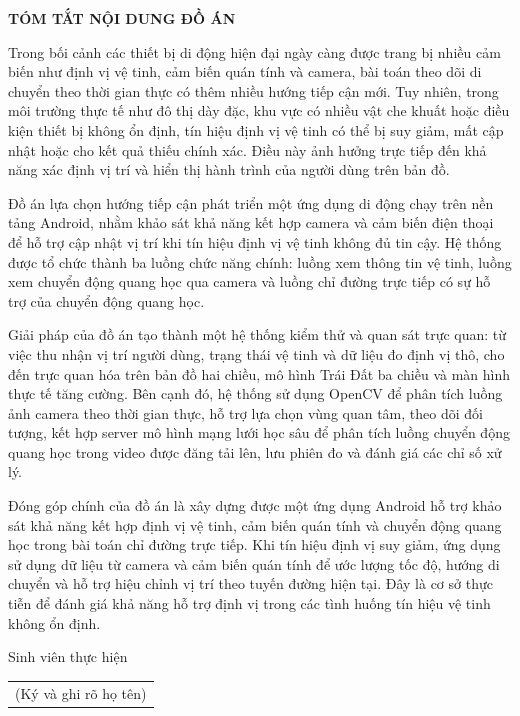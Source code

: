 \documentclass[../DoAn.tex]{subfiles}
\begin{document}
\begin{center}
    \Large{\textbf{TÓM TẮT NỘI DUNG ĐỒ ÁN}}\\
\end{center}
\vspace{1cm}

Trong bối cảnh các thiết bị di động hiện đại ngày càng được trang bị nhiều cảm biến như định vị vệ tinh, cảm biến quán tính và camera, bài toán theo dõi di chuyển theo thời gian thực có thêm nhiều hướng tiếp cận mới. Tuy nhiên, trong môi trường thực tế như đô thị dày đặc, khu vực có nhiều vật che khuất hoặc điều kiện thiết bị không ổn định, tín hiệu định vị vệ tinh có thể bị suy giảm, mất cập nhật hoặc cho kết quả thiếu chính xác. Điều này ảnh hưởng trực tiếp đến khả năng xác định vị trí và hiển thị hành trình của người dùng trên bản đồ.

Đồ án lựa chọn hướng tiếp cận phát triển một ứng dụng di động chạy trên nền tảng Android, nhằm khảo sát khả năng kết hợp camera và cảm biến điện thoại để hỗ trợ cập nhật vị trí khi tín hiệu định vị vệ tinh không đủ tin cậy. Hệ thống được tổ chức thành ba luồng chức năng chính: luồng xem thông tin vệ tinh, luồng xem chuyển động quang học qua camera và luồng chỉ đường trực tiếp có sự hỗ trợ của chuyển động quang học.

Giải pháp của đồ án tạo thành một hệ thống kiểm thử và quan sát trực quan: từ việc thu nhận vị trí người dùng, trạng thái vệ tinh và dữ liệu đo định vị thô, cho đến trực quan hóa trên bản đồ hai chiều, mô hình Trái Đất ba chiều và màn hình thực tế tăng cường. Bên cạnh đó, hệ thống sử dụng OpenCV để phân tích luồng ảnh camera theo thời gian thực, hỗ trợ lựa chọn vùng quan tâm, theo dõi đối tượng, kết hợp server mô hình mạng lưới học sâu để phân tích luồng chuyển động quang học trong video được đăng tải lên, lưu phiên đo và đánh giá các chỉ số xử lý.

Đóng góp chính của đồ án là xây dựng được một ứng dụng Android hỗ trợ khảo sát khả năng kết hợp định vị vệ tinh, cảm biến quán tính và chuyển động quang học trong bài toán chỉ đường trực tiếp. Khi tín hiệu định vị suy giảm, ứng dụng sử dụng dữ liệu từ camera và cảm biến quán tính để ước lượng tốc độ, hướng di chuyển và hỗ trợ hiệu chỉnh vị trí theo tuyến đường hiện tại. Đây là cơ sở thực tiễn để đánh giá khả năng hỗ trợ định vị trong các tình huống tín hiệu vệ tinh không ổn định.



\begin{flushright}
Sinh viên thực hiện\\
\begin{tabular}{@{}c@{}}
(Ký và ghi rõ họ tên)
\end{tabular}
\end{flushright}
\end{document}
